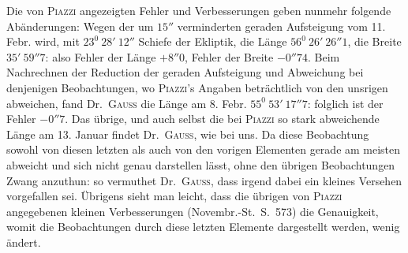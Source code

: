 Die von \textsc{Piazzi} angezeigten Fehler und Verbesserungen geben nunmehr folgende Abänderungen: Wegen der um $15''$ verminderten geraden Aufsteigung vom 11. Febr. wird, mit $23^0\ 28'\ 12''$ Schiefe der Ekliptik, die Länge $56^0\ 26'\ 26''1$, die Breite $35'\ 59''7$: also Fehler der Länge $+8''0$, Fehler der Breite $-0''74$. Beim Nachrechnen der Reduction der geraden Aufsteigung und Abweichung bei denjenigen Beobachtungen, wo \textsc{Piazzi}'s Angaben beträchtlich von den unsrigen abweichen, fand Dr.\ \textsc{Gauss} die Länge am 8. Febr. $55^0\ 53'\ 17''7$: folglich ist der Fehler $-0''7$. Das übrige, und auch selbst die bei \textsc{Piazzi} so stark abweichende Länge am 13. Januar findet Dr.\ \textsc{Gauss}, wie bei uns. Da diese Beobachtung sowohl von diesen letzten als auch von den vorigen Elementen gerade am meisten abweicht und sich nicht genau darstellen lässt, ohne den übrigen Beobachtungen Zwang anzuthun: so vermuthet Dr.\ \textsc{Gauss}, dass irgend dabei ein kleines Versehen vorgefallen sei. Übrigens sieht man leicht, dass die übrigen von \textsc{Piazzi} angegebenen kleinen Verbesserungen (Novembr.-St.\ S.\ 573) die Genauigkeit, womit die Beobachtungen durch diese letzten Elemente dargestellt werden, wenig ändert.

